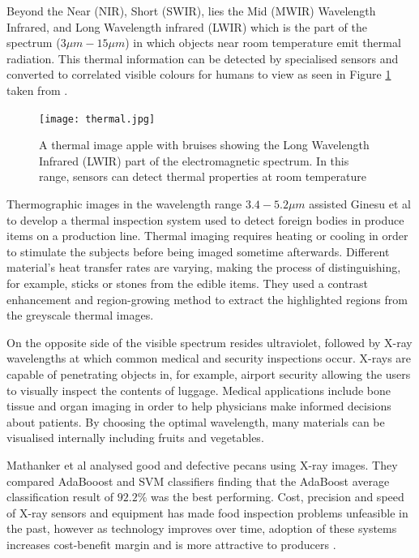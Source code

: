 \documentclass[fleqn,twoside,12pt]{report}
\begin{document}
Beyond the Near (NIR), Short (SWIR), lies the Mid (MWIR) Wavelength Infrared, and  Long Wavelength infrared (LWIR) which is the part of the spectrum ($3\mu m-15\mu m$) in which objects near room temperature emit thermal radiation. This thermal information can be detected by specialised sensors and converted to correlated visible colours for humans to view as seen in Figure \ref{fig:thermal} taken from \cite{baranowski}.

\begin{figure}[h]
	\centering
	\texttt{[image: thermal.jpg]}
	\caption{A thermal image apple with bruises showing the Long Wavelength Infrared (LWIR) part of the electromagnetic spectrum. In this range, sensors can detect thermal properties at room temperature}
	\label{fig:thermal}
\end{figure}%


Thermographic images in the wavelength range $3.4-5.2\mu m$ assisted Ginesu et al \cite{ginesu} to develop a thermal inspection system used to detect foreign bodies in produce items on a production line. Thermal imaging requires heating or cooling in order to stimulate the subjects before being imaged sometime afterwards. Different material's heat transfer rates are varying, making the process of distinguishing, for example, sticks or stones from the edible items. They used a contrast enhancement and region-growing method to extract the highlighted regions from the greyscale thermal images.

On the opposite side of the visible spectrum resides ultraviolet, followed by X-ray wavelengths at which common medical and security inspections occur. X-rays are capable of penetrating objects in, for example, airport security allowing the users to visually inspect the contents of luggage. Medical applications include bone tissue and organ imaging in order to help physicians make informed decisions about patients. By choosing the optimal wavelength, many materials can be visualised internally including fruits and vegetables.    

Mathanker et al \cite{mathanker} analysed good and defective pecans using X-ray images. They compared AdaBooost and SVM classifiers finding that the AdaBoost average classification result of $92.2\%$ was the best performing. Cost, precision and speed of X-ray sensors and equipment has made food inspection problems unfeasible in the past, however as technology improves over time, adoption of these systems increases cost-benefit margin and is more attractive to producers \cite{haff}.
\end{document}
